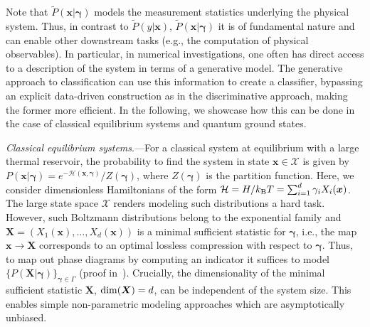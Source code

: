 \documentclass[twocolumn,aps,prl,superscriptaddress,tightlines,nofootinbib]{revtex4-2}
\begin{document}
\indent Note that $\tilde{P}(\bm{x}|\bm{\gamma})$ models the measurement statistics underlying the physical system. Thus, in contrast to $\tilde{P}(y|\bm{x})$, $\tilde{P}(\bm{x}|\bm{\gamma})$ it is of fundamental nature and can enable other downstream tasks (e.g., the computation of physical observables). In particular, in numerical investigations, one often has direct access to a description of the system in terms of a generative model. The generative approach to classification can use this information to create a classifier, bypassing an explicit data-driven construction as in the discriminative approach, making the former more efficient. In the following, we showcase how this can be done in the case of classical equilibrium systems and quantum ground states.

\indent \emph{Classical equilibrium systems}.---For a classical system at equilibrium with a large thermal reservoir, the probability to find the system in state $\bm{x} \in \mathcal{X}$ is given by $P(\bm{x}| \bm{\gamma}) = e^{-\mathcal{H}(\bm{x},\bm{\gamma})}/Z(\bm{\gamma})$,
where $Z(\bm{\gamma})$ is the partition function. Here, we consider dimensionless Hamiltonians of the form $\mathcal{H} = H/k_{\rm B}T = \sum_{i=1}^{d} \gamma_{i} X_{i}(\bm{x})$. The large state space $\mathcal{X}$ renders modeling such distributions a hard task. However, such Boltzmann distributions belong to the exponential family and $\bm{X} = \left( X_{1}(\bm{x}), \dots, X_{d}(\bm{x}) \right)$ is a minimal sufficient statistic for $\bm{\gamma}$, i.e., the map $\bm{x} \rightarrow \bm{X}$ corresponds to an optimal lossless compression with respect to $\bm{\gamma}$. Thus, to map out phase diagrams by computing an indicator it suffices to model $\{ P(\bm{X}|\bm{\gamma})\}_{\bm{\gamma} \in \Gamma}$ (proof in~\cite{suppl}). Crucially, the dimensionality of the minimal sufficient statistic $\bm{X}$, ${\rm dim}(\bm{X}) = d$, can be independent of the system size. This enables simple non-parametric modeling approaches which are asymptotically unbiased.
\end{document}
